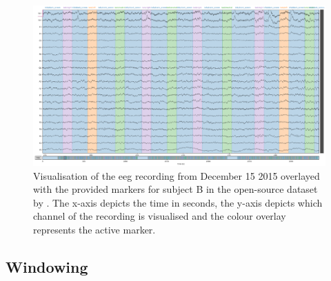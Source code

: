 \begin{figure}[ht]
    \centering
    \includegraphics[width=\linewidth]{../images/pipeline/eeg.pdf}
    \captionsetup{width=0.9\linewidth}
    \captionsetup{justification=centering}
    \caption{Visualisation of the \gls{eeg} recording from December 15 2015 overlayed with the provided markers for subject B in the open-source dataset by \citet{eeg_data}. The x-axis depicts the time in seconds, the y-axis depicts which channel of the recording is visualised and the colour overlay represents the active marker.}
    \label{fig:processing_signals_data_source_eeg}
\end{figure}


\subsection{Windowing}
\label{subsec:processing_signals_general_pipeline_windowing}



